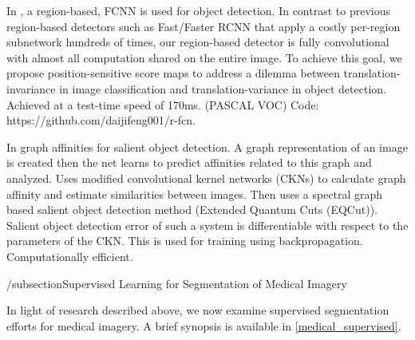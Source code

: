 \documentclass[letterpaper, 10 pt, conference]{ieeeconf}  %
\begin{document}
In \cite{dai_r-fcn:_2016}, a region-based, FCNN is used for object detection. In contrast to previous region-based detectors such as Fast/Faster RCNN that apply a costly per-region subnetwork hundreds of times, our region-based detector is fully convolutional with almost all computation shared on the entire image. To achieve this goal, we propose position-sensitive score maps to address a dilemma between translation-invariance in image classification and translation-variance in object detection. Achieved at a test-time speed of 170ms. (PASCAL VOC) Code: https://github.com/daijifeng001/r-fcn.

In \cite{aytekin_learning_graph} graph affinities for salient object detection. A graph representation of an image is created then the net learns to predict affinities related to this graph and analyzed. Uses modified convolutional kernel networks (CKNs) to calculate graph affinity  and estimate similarities between images. Then uses a spectral graph based salient object detection method (Extended Quantum Cuts (EQCut)). Salient object detection error of such a system is differentiable with respect to the parameters of the CKN. This is used for training using backpropagation.  Computationally efficient.

/subsection{Supervised Learning for Segmentation of Medical Imagery}

In light of research described above, we now examine supervised segmentation efforts for medical imagery. A brief synopsis is available in \ref{medical_supervised}. 
\end{document}
